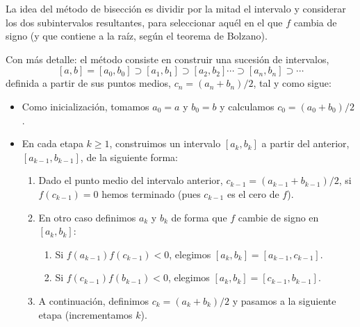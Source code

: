 La idea del método de bisección es dividir por la mitad el intervalo y
considerar los dos subintervalos resultantes, para seleccionar aquél
en el que $f$ cambia de signo (y que contiene a la raíz, según el
teorema de Bolzano).

Con más detalle: el método consiste en construir una sucesión de
intervalos,
\begin{equation}
\label{eq:tema1:bisecc:0}
[a,b]=[a_0,b_0] \supset [a_1,b_1] \supset [a_2,b_2] \cdots \supset
[a_n,b_n] \supset \cdots
\end{equation}
definida a partir de sus puntos medios, $c_n=(a_n+b_n)/2$, tal y como sigue:
\begin{itemize}
\item Como inicialización, tomamos $a_0=a$ y $b_0=b$ y calculamos
  $c_0=(a_0+b_0)/2$.
\item En cada etapa $k\ge 1$, construimos un intervalo $[a_k,b_k]$ a
  partir del anterior, $[a_{k-1}, b_{k-1}]$, de la siguiente forma:
  \begin{enumerate}
  \item Dado el punto medio del intervalo anterior,
    $c_{k-1}=(a_{k-1}+b_{k-1})/2$, si $f(c_{k-1})=0$ hemos terminado
    (pues $c_{k-1}$ es el cero de $f$).
  \item En otro caso definimos $a_k$ y $b_k$ de forma que $f$ cambie de
    signo en $[a_k,b_k]$:
    \begin{enumerate}
    \item Si $f(a_{k-1})f(c_{k-1})<0$, elegimos $[a_k,b_k]=[a_{k-1}, c_{k-1}]$.
    \item Si $f(c_{k-1})f(b_{k-1})<0$, elegimos $[a_k,b_k]=[c_{k-1}, b_{k-1}]$.
    \end{enumerate}
  \item A continuación, definimos $c_k=(a_k+b_k)/2$ y pasamos a la
    siguiente etapa (incrementamos $k$).
  \end{enumerate}
\end{itemize}

